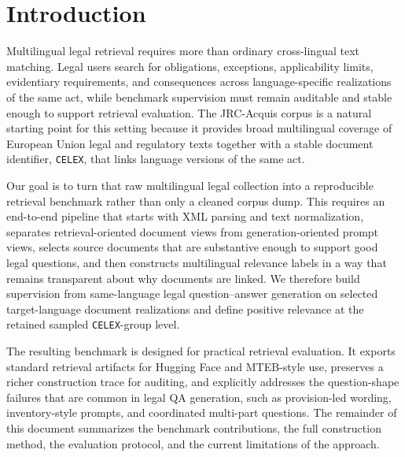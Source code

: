 \section{Introduction}

Multilingual legal retrieval requires more than ordinary cross-lingual text matching. Legal users search for obligations, exceptions, applicability limits, evidentiary requirements, and consequences across language-specific realizations of the same act, while benchmark supervision must remain auditable and stable enough to support retrieval evaluation. The JRC-Acquis corpus is a natural starting point for this setting because it provides broad multilingual coverage of European Union legal and regulatory texts together with a stable document identifier, \texttt{CELEX}, that links language versions of the same act.

Our goal is to turn that raw multilingual legal collection into a reproducible retrieval benchmark rather than only a cleaned corpus dump. This requires an end-to-end pipeline that starts with XML parsing and text normalization, separates retrieval-oriented document views from generation-oriented prompt views, selects source documents that are substantive enough to support good legal questions, and then constructs multilingual relevance labels in a way that remains transparent about why documents are linked. We therefore build supervision from same-language legal question--answer generation on selected target-language document realizations and define positive relevance at the retained sampled \texttt{CELEX}-group level.

The resulting benchmark is designed for practical retrieval evaluation. It exports standard retrieval artifacts for Hugging Face and MTEB-style use, preserves a richer construction trace for auditing, and explicitly addresses the question-shape failures that are common in legal QA generation, such as provision-led wording, inventory-style prompts, and coordinated multi-part questions. The remainder of this document summarizes the benchmark contributions, the full construction method, the evaluation protocol, and the current limitations of the approach.
